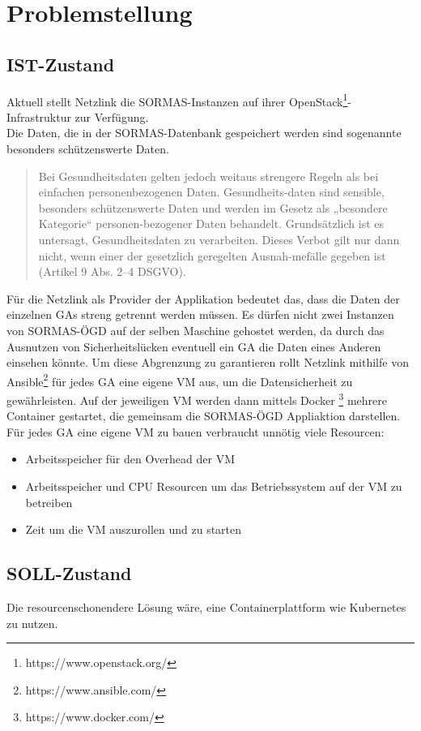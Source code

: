 \section{Problemstellung}
\subsection{IST-Zustand}
Aktuell stellt Netzlink die \ac{SORMAS}-Instanzen auf ihrer OpenStack\footnote{https://www.openstack.org/}-Infrastruktur zur Verfügung. 
\\
Die Daten, die in der \ac{SORMAS}-Datenbank gespeichert werden sind sogenannte besonders schützenswerte Daten.
\begin{quote}
    Bei Gesundheitsdaten gelten jedoch weitaus strengere Regeln als bei einfachen personenbezogenen Daten. Gesundheits-daten sind sensible, besonders schützenswerte Daten und werden im Gesetz als „besondere Kategorie“ personen-bezogener Daten behandelt. Grundsätzlich ist es untersagt, Gesundheitsdaten zu verarbeiten. Dieses Verbot gilt nur dann nicht, wenn einer der gesetzlich geregelten Ausnah-mefälle gegeben ist (Artikel 9 Abs. 2–4 DSGVO). 
    \cite{Gesundheitsdatenschutz}
\end{quote}
Für die Netzlink als Provider der Applikation bedeutet das, dass die Daten der einzelnen \ac{GAs} streng getrennt werden müssen. 
Es dürfen nicht zwei Instanzen von \ac{SORMAS-ÖGD} auf der selben Maschine gehostet werden, da durch das Ausnutzen von Sicherheitslücken eventuell ein \ac{GA} die Daten eines Anderen einsehen könnte.
Um diese Abgrenzung zu garantieren rollt Netzlink mithilfe von Ansible\footnote{https://www.ansible.com/} für jedes \ac{GA} eine eigene \ac{VM} aus, um die Datensicherheit zu gewährleisten.
Auf der jeweiligen \ac{VM} werden dann mittels Docker \footnote{https://www.docker.com/} mehrere Container gestartet, die gemeinsam die \ac{SORMAS-ÖGD} Appliaktion darstellen.
\\
Für jedes \ac{GA} eine eigene VM zu bauen verbraucht unnötig viele Resourcen:
\begin{itemize}
    \item Arbeitsspeicher für den Overhead der \ac{VM}
    \item Arbeitsspeicher und CPU Resourcen um das Betriebssystem auf der \ac{VM} zu betreiben
    \item Zeit um die \ac{VM} auszurollen und zu starten 
\end{itemize}

\subsection{SOLL-Zustand}
Die resourcenschonendere Lösung wäre, eine Containerplattform wie Kubernetes zu nutzen. 





